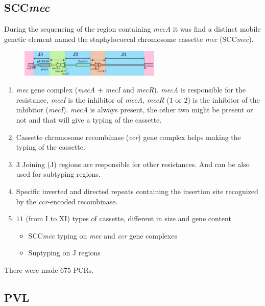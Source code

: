 \subsection{SCC\emph{mec}}

During the sequencing of the region containing \emph{mecA} it was find a distinct mobile genetic element named the staphylococcal chromosome cassette \emph{mec} (SCC\emph{mec}).

\begin{figure}[h]
\centering
\includegraphics[width=0.6\textwidth]{SCCmec.png}
\caption{}
\end{figure}

\begin{enumerate}
    \item \emph{mec} gene complex (\emph{mecA} + \emph{mecI} and \emph{mecR}). \emph{mecA} is responsible for the resistance, \emph{mecI} is the inhibitor of \emph{mecA}, \emph{mecR} ($1$ or $2$) is the inhibitor of the inhibitor (\emph{mecI}). \emph{mecA} is always present, the other two might be present or not and that will give a typing of the cassette.
    \item Cassette chromosome recombinase (\emph{ccr}) gene complex helps making the typing of the cassette. 
    \item $3$ Joining (J) regions are responsible for other resistances. And can be also used for subtyping regions. 
    \item Specific inverted and directed repeats containing the insertion site recognized by the \emph{ccr}-encoded recombinase. 
    \item $11$ (from I to XI) types of cassette, different in size and gene content
    \begin{itemize}
        \item SCC\emph{mec} typing on \emph{mec} and \emph{ccr} gene complexes
        \item Suptyping on J regions
    \end{itemize}
\end{enumerate}

There were made $675$ PCRs.

\subsection{PVL}

